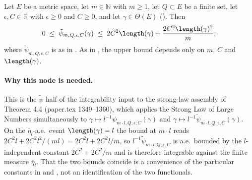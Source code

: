 \begin{lemma}
  Let $E$ be a metric space, let $m \in \mathbb{N}$ with $m \ge 1$, let $Q \subset E$ be a finite
  set, let $\epsilon, C \in \mathbb{R}$ with $\epsilon \ge 0$ and $C \ge 0$, and let
  $\gamma \in \Theta(E)$ (). Then
  \[
    0 \;\le\; \tilde\psi_{m,Q,\epsilon,C}(\gamma)
      \;\le\; 2C^2\length(\gamma) + \frac{2C^2\length(\gamma)^2}{m}
    ,
  \]
  where $\tilde\psi_{m,Q,\epsilon,C}$ is as in . As in
  , the upper bound depends only on $m$, $C$ and $\length(\gamma)$.

  \paragraph{Why this node is needed.} This is the $\tilde\psi$ half of the integrability input to
  the strong-law assembly of Theorem 4.4 (paper.tex 1349--1360), which applies the Strong Law of
  Large Numbers simultaneously to $\gamma\mapsto l^{-1}\psi_{m\cdot l,Q,\epsilon,C}(\gamma)$ and
  $\gamma\mapsto l^{-1}\tilde\psi_{m\cdot l,Q,\epsilon,C}(\gamma)$. On the
  $\overline\eta_l$-a.e.\ event $\length(\gamma)=l$ the bound at $m\cdot l$ reads
  $2C^2l + 2C^2l^2/(ml) = 2C^2l + 2C^2l/m$, so $l^{-1}\tilde\psi_{m\cdot l,Q,\epsilon,C}$ is
  a.e.\ bounded by the $l$-independent constant $2C^2+2C^2/m$ and is therefore integrable against
  the finite measure $\overline\eta_l$. That the two bounds coincide is a convenience of the
  particular constants in  and , not an identification of the two
  functionals.
\end{lemma}
